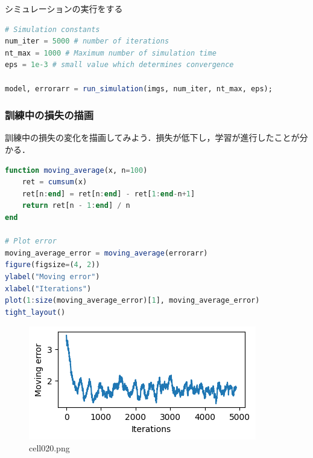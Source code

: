 シミュレーションの実行をする
\begin{lstlisting}[language=julia]
# Simulation constants
num_iter = 5000 # number of iterations
nt_max = 1000 # Maximum number of simulation time
eps = 1e-3 # small value which determines convergence

model, errorarr = run_simulation(imgs, num_iter, nt_max, eps);
\end{lstlisting}
\subsubsection{訓練中の損失の描画}
訓練中の損失の変化を描画してみよう．損失が低下し，学習が進行したことが分かる．
\begin{lstlisting}[language=julia]
function moving_average(x, n=100)
    ret = cumsum(x)
    ret[n:end] = ret[n:end] - ret[1:end-n+1]
    return ret[n - 1:end] / n
end

# Plot error
moving_average_error = moving_average(errorarr)
figure(figsize=(4, 2))
ylabel("Moving error")
xlabel("Iterations")
plot(1:size(moving_average_error)[1], moving_average_error)
tight_layout()
\end{lstlisting}
\begin{figure}[ht]
	\centering
	\includegraphics[scale=0.8, max width=\linewidth]{./fig/energy-based-model/predictive-coding/cell020.png}
	\caption{cell020.png}
	\label{cell020.png}
\end{figure}
